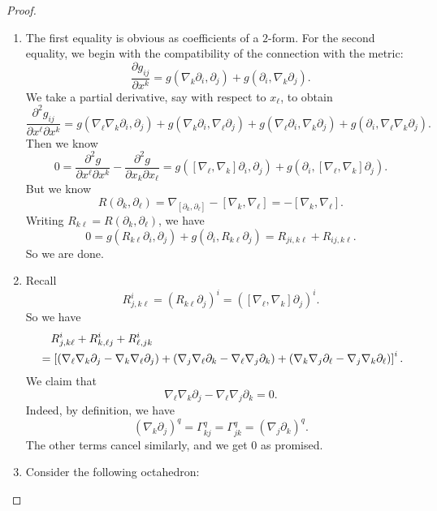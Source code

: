 \documentclass[a4paper]{article}
\begin{document}
\begin{proof}\leavevmode
  \begin{enumerate}
    \item The first equality is obvious as coefficients of a $2$-form. For the second equality, we begin with the compatibility of the connection with the metric:
      \[
        \frac{\partial g_{ij}}{\partial x^k} = g(\nabla_k \partial_i, \partial_j) + g(\partial_i, \nabla_k \partial_j).
      \]
      We take a partial derivative, say with respect to $x_\ell$, to obtain
      \[
        \frac{\partial^2 g_{ij}}{\partial x^\ell \partial x^k} = g(\nabla_\ell \nabla_k \partial_i, \partial_j) + g(\nabla_k \partial_i, \nabla_\ell \partial_j) + g(\nabla_\ell \partial_i, \nabla_k \partial_j) + g(\partial_i, \nabla_\ell \nabla_k \partial_j).
      \]
      Then we know
      \[
        0 = \frac{\partial^2 g}{\partial x^\ell \partial x^k} - \frac{\partial^2 g}{\partial x_k \partial x_\ell} = g([\nabla_\ell, \nabla_k] \partial_i, \partial_j) + g(\partial_i, [\nabla_\ell, \nabla_k]\partial_j).
      \]
      But we know
      \[
        R(\partial_k, \partial_\ell) = \nabla_{[\partial_k, \partial_\ell]} - [\nabla_k, \nabla_\ell] = -[\nabla_k, \nabla_\ell].
      \]
      Writing $R_{k\ell} = R(\partial_k, \partial_\ell)$, we have
      \[
        0 = g(R_{k\ell} \partial_i, \partial_j) + g(\partial_i, R_{k\ell} \partial_j) = R_{ji, k\ell} + R_{ij, k\ell}.
      \]
      So we are done.
    \item Recall
      \[
        R^i_{j, k\ell} = (R_{k\ell} \partial_j)^i = ([\nabla_\ell, \nabla_k] \partial_j)^i.
      \]
      So we have
      \begin{align*}
        &\hphantom{={}}R^i_{j, k\ell} + R^i_{k, \ell j} + R^i_{\ell, jk}\\
        &= \left[(\nabla_\ell \nabla_k \partial_j - \nabla_k \nabla_\ell \partial_j) + (\nabla_j \nabla_\ell \partial_k - \nabla_\ell \nabla_j \partial_k) + (\nabla_k \nabla_j \partial_\ell - \nabla_j \nabla_k \partial_\ell)\right]^i.
      \end{align*}
      We claim that
      \[
        \nabla_\ell \nabla_k \partial_j - \nabla_\ell \nabla_j \partial_k = 0.
      \]
      Indeed, by definition, we have
      \[
        (\nabla_k \partial_j)^q = \Gamma_{kj}^q = \Gamma_{jk}^q = (\nabla_j \partial_k)^q.
      \]
      The other terms cancel similarly, and we get $0$ as promised.
    \item Consider the following octahedron:
      \begin{center}
\end{center}
\end{enumerate}
\end{proof}
\end{document}
